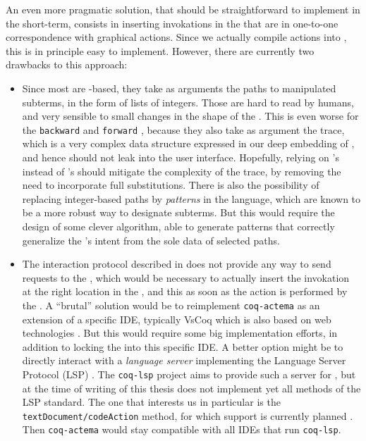 An even more pragmatic solution, that should be straightforward to implement in
the short-term, consists in inserting  invokations in the 
that are in one-to-one correspondence with graphical actions. Since we actually
compile actions into , this is in principle easy to implement. However,
there are currently two drawbacks to this approach:
\begin{itemize}
  \item Since most  are -based, they take as arguments the
  paths to manipulated subterms, in the form of lists of integers. Those are
  hard to read by humans, and very sensible to small changes in the shape of the
  . This is even worse for the \texttt{backward} and \texttt{forward}
  , because they also take as argument the  trace,
  which is a very complex data structure expressed in our deep embedding of
  , and hence should not leak into the user interface.
  Hopefully, relying on 's  instead of 's should mitigate
  the complexity of the trace, by removing the need to incorporate full
  substitutions. There is also the possibility of replacing integer-based paths
  by \emph{patterns} in the {\ssreflect} language, which are known to be a more
  robust way to designate subterms. But this would require the design of some
  clever algorithm, able to generate patterns that correctly generalize the
  's intent from the sole data of selected paths.

  \item The interaction protocol described in  does not provide
  any way to send requests to the , which would be necessary to
  actually insert the  invokation at the right location in the , and this as soon as the action is performed by the . A
  ``brutal'' solution would be to reimplement \texttt{coq-actema} as an
  extension of a specific IDE, typically VsCoq which is also based on web
  technologies \cite{VsCoq}. But this would require some big implementation
  efforts, in addition to locking the  into this specific IDE. A
  better option might be to directly interact with a \emph{language server}
  implementing the Language Server Protocol (LSP) \cite{LSP}. The
  \texttt{coq-lsp} project aims to provide such a server for , but at the
  time of writing of this thesis does not implement yet all methods of the LSP
  standard. The one that interests us in particular is the
  \texttt{textDocument/codeAction} method, for which support is currently
  planned \cite{coq-lsp-proto}. Then \texttt{coq-actema} would stay compatible
  with all IDEs that run \texttt{coq-lsp}.
\end{itemize}
